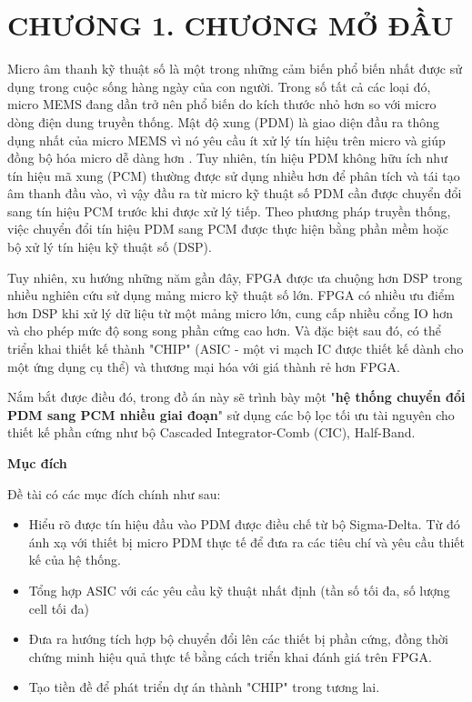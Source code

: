 \section*{CHƯƠNG 1.  CHƯƠNG MỞ ĐẦU}
Micro âm thanh kỹ thuật số là một trong những cảm biến phổ biến nhất được sử dụng trong cuộc sống hàng ngày của con người. Trong số tất cả các loại đó, micro MEMS đang dần trở nên phổ biến do kích thước nhỏ hơn so với micro dòng điện dung truyền thống. Mật độ xung (PDM) là giao diện đầu ra thông dụng nhất của micro MEMS vì nó yêu cầu ít xử lý tín hiệu trên micro và giúp đồng bộ hóa micro dễ dàng hơn \cite{mems}. Tuy nhiên, tín hiệu PDM không hữu ích như tín hiệu mã xung (PCM) thường được sử dụng nhiều hơn để phân tích và tái tạo âm thanh đầu vào, vì vậy đầu ra từ micro kỹ thuật số PDM cần được chuyển đổi sang tín hiệu PCM trước khi được xử lý tiếp. Theo phương pháp truyền thống, việc chuyển đổi tín hiệu PDM sang PCM được thực hiện bằng phần mềm hoặc bộ xử lý tín hiệu kỹ thuật số (DSP).

Tuy nhiên, xu hướng những năm gần đây, FPGA được ưa chuộng hơn DSP trong nhiều nghiên cứu sử dụng mảng micro kỹ thuật số lớn. FPGA có nhiều ưu điểm hơn DSP khi xử lý dữ liệu từ một mảng micro lớn, cung cấp nhiều cổng IO hơn và cho phép mức độ song song phần cứng cao hơn. Và đặc biệt sau đó, có thể triển khai thiết kế thành "CHIP" (ASIC - một vi mạch IC được thiết kế dành cho một ứng dụng cụ thể) và thương mại hóa với giá thành rẻ hơn FPGA.

Nắm bắt được điều đó, trong đồ án này sẽ trình bày một "\textbf{hệ thống chuyển đổi PDM sang PCM nhiều giai đoạn}" sử dụng các bộ lọc tối ưu tài nguyên cho thiết kế phần cứng như bộ Cascaded Integrator-Comb (CIC), Half-Band.

\noindent \textbf{Mục đích}

Đề tài có các mục đích chính như sau:
\begin{itemize}
    \item Hiểu rõ được tín hiệu đầu vào PDM được điều chế từ bộ Sigma-Delta. Từ đó ánh xạ với thiết bị micro PDM thực tế để đưa ra các tiêu chí và yêu cầu thiết kế của hệ thống.
    \item  Tổng hợp ASIC với các yêu cầu kỹ thuật nhất định (tần số tối đa, số lượng cell tối đa) 
    \item Đưa ra hướng tích hợp bộ chuyển đổi lên các thiết bị phần cứng, đồng thời chứng minh hiệu quả thực tế bằng cách triển khai đánh giá trên FPGA.
    \item Tạo tiền đề để phát triển dự án thành "CHIP" trong tương lai.
\end{itemize}

